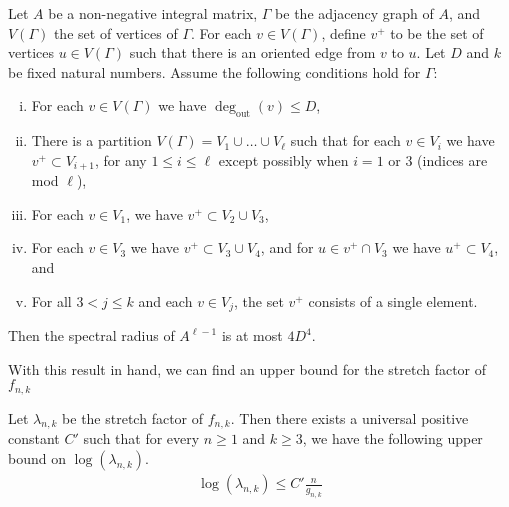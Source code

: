 \begin{lem}
\label{lem:spectral}
Let $A$ be a non-negative integral matrix, $\Gamma$ be the adjacency graph of $A$, and $V(\Gamma)$ the set of
vertices of $\Gamma$. For each $v \in V(\Gamma)$, define $v^+$ to be the set of vertices $u\in V(\Gamma)$ such that there
is an oriented edge from $v$ to $u$. Let $D$ and $k$ be fixed natural numbers. Assume the following conditions
hold for $\Gamma$:
\begin{enumerate}[(i)]
\item For each $v \in V(\Gamma)$ we have $\deg_{\text{out}}(v) \leq D$,
\item There is a partition $V(\Gamma) = V_1 \cup \dots \cup V_\ell$ such that for each $v \in V_i$ we have
  $v^+ \subset V_{i+1}$, for any $1 \leq i \leq \ell$ except possibly when $i = 1$ or 3 (indices are mod $\ell$),
\item For each $v \in V_1$, we have $v^+ \subset V_2 \cup V_3$,
\item For each $v \in V_3$ we have $v^+ \subset V_3 \cup V_4$, and for $u \in v^+ \cap V_3$ we have
  $u^+ \subset V_4$, and 
\item For all $3 < j \leq k$ and each $v \in V_j$, the set $v^+$ consists of a single element.
\end{enumerate}

Then the spectral radius of $A^{\ell-1}$ is at most $4D^4$.

\end{lem}
\noindent With this result in hand, we can find an upper bound for the stretch factor of $f_{n,k}$

\begin{lem}\label{lem:upperbound}
  Let $\lambda_{n,k}$ be the stretch factor of $f_{n,k}$. Then there exists a universal positive constant $C'$ such that for every $n \geq 1$ and $k \geq 3$, we have the following upper bound on $\log(\lambda_{n,k})$.
  \begin{align*}
   \log(\lambda_{n,k}) \leq C'\frac{n}{g_{n,k}}
  \end{align*}
\end{lem}

